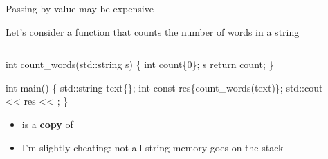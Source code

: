 \begin{frame}[fragile]{Passing by value may be expensive}

  Let's consider a function that counts the number of words in a string

  \begin{columns}
    \begin{column}{.5\textwidth}

      \begin{codeblock}
int count_words(std::string \alert<5>{s})
\{
  int count\{0\};
  \ddd s \ddd
  return count;
\}

\alert<2|trans:0>{int main()
\{
  std::string text}\alert<3|trans:0>{\{\ddd\}};
  \alert<2|trans:0>{int const res}\{\alert<4|trans:0>{count_words(}\alert<5>{text}\alert<4|trans:0>{)}\};
  std::cout <{}< res <{}< \bslashn;
\alert<2|trans:0>{\}}\end{codeblock}

      \begin{itemize}
      \item<5->  is a \textbf{copy} of 
      \item<6-> I'm slightly cheating: not all string memory goes on the stack
      \end{itemize}

    \end{column}

    \begin{column}{.4\textwidth}


\end{column}
\end{columns}
\end{frame}

